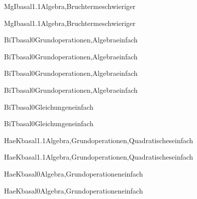 \documentclass[12pt]{article}
\begin{document}
    \begin{Add}{MgI}{basal1.1}{Algebra,Bruchterme}{schwieriger}
    \solution{ }
    \end{Add}
    \begin{Add}{MgI}{basal1.1}{Algebra,Bruchterme}{schwieriger}
    \end{Add}
    

\begin{Add}{BiT}{basal0}{Grundoperationen,Algebra}{einfach}
\solution{ }
\end{Add}
\begin{Add}{BiT}{basal0}{Grundoperationen,Algebra}{einfach}
\end{Add}

\begin{Add}{BiT}{basal0}{Grundoperationen,Algebra}{einfach}
\solution{ }
\end{Add}
\begin{Add}{BiT}{basal0}{Grundoperationen,Algebra}{einfach}
\end{Add}

\begin{Add}{BiT}{basal0}{Gleichungen}{einfach}
\solution{ }
\end{Add}
\begin{Add}{BiT}{basal0}{Gleichungen}{einfach}
\end{Add}

\begin{Add}{HaeK}{basal1.1}{Algebra,Grundoperationen,Quadratisches}{einfach}
\solution{ }
\end{Add}
\begin{Add}{HaeK}{basal1.1}{Algebra,Grundoperationen,Quadratisches}{einfach}
\end{Add}

\begin{Add}{HaeK}{basal0}{Algebra,Grundoperationen}{einfach}
\solution{ }
\end{Add}
\begin{Add}{HaeK}{basal0}{Algebra,Grundoperationen}{einfach}
\end{Add}
\end{document}
